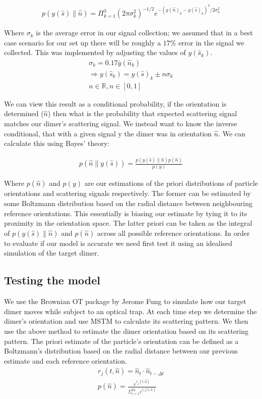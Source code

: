 \documentclass[11pt]{article}
\begin{document}
\begin{align}
	p(y(\hat{s})\parallel\hat{n}) = \Pi^3_{k=1} 
	(2\pi\sigma_k^2)^{-1/2} e^{-(y(\hat{n})_k-y(\hat{s})_k)^2/2\sigma_k^2}
\end{align}

Where $\sigma_k$ is the average error in our signal collection; we assumed that in a best case scenario for our set up there will be roughly a $17\%$ error in the signal we collected. This was implemented by adjusting the values of $y(\hat{s}_k)$. 
\begin{eqnarray*}
	\sigma_k = 0.17\bar{y}(\hat{n}_k) \\
	\Rightarrow y(\hat{s}_k) = y(\hat{s})_k \pm n\sigma_k \\ 
	n \in \mathbb{R}, n\in[0,1]
\end{eqnarray*}
	
We can view this result as a conditional probability, if the orientation is determined ($\hat{n}$) then what is the probability that expected scattering signal matches our dimer's scattering signal. We instead want to know the inverse conditional, that with a given signal y the dimer was in orientation $\hat{n}$. We can calculate this using Bayes' theory:

\begin{align}
	p(\hat{n}\parallel y(\hat{s})) = \frac{p(y(\hat{s})\parallel\hat{n})p(\hat{n})}{p(y)}
\end{align}

Where $p(\hat{n})$ and $p(y)$ are our estimations of the priori distributions of particle orientations and scattering signals respectively. The former can be estimated by some Boltzmann distribution based on the radial distance between neighbouring reference orientations. This essentially is biasing our estimate by tying it to its proximity in the orientation space. The latter priori can be taken as the integral of  $p(y(\hat{s})\parallel \hat{n})$ and $p(\hat{n})$ across all possible reference orientations. In order to evaluate if our model is accurate we need first test it using an idealised simulation of the target dimer. 

\subsection*{Testing the model}
We use the Brownian OT package by Jerome Fung \cite{5} to simulate how our target dimer moves while subject to an optical trap. At each time step we determine the dimer's orientation and use MSTM to calculate its scattering pattern. We then use the above method to estimate the dimer orientation based on its scattering pattern. The priori estimate of the particle's orientation can be defined as a Boltzmann's distribution based on the radial distance between our previous estimate and each reference orientation. 
\begin{align}
	r_j(t, \hat{n}) = \hat{n}_{t} \cdot \hat{n}_{t-\Delta t} \\
	p(\hat{n}) = \frac{e^{r_j(t,\hat{n})}}
	{\Sigma_{i=1}^{24}e^{r_i(t, \hat{n})}}
\end{align}
\end{document}
